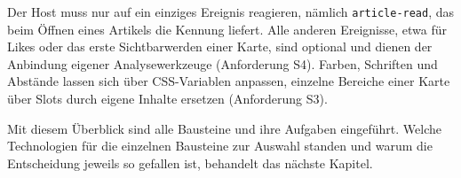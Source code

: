 Der Host muss nur auf ein einziges Ereignis reagieren, nämlich \texttt{article-read}, das beim Öffnen eines Artikels die Kennung liefert.
Alle anderen Ereignisse, etwa für Likes oder das erste Sichtbarwerden einer Karte, sind optional und dienen der Anbindung eigener Analysewerkzeuge (Anforderung S4).
Farben, Schriften und Abstände lassen sich über CSS-Variablen anpassen, einzelne Bereiche einer Karte über Slots durch eigene Inhalte ersetzen (Anforderung S3).

Mit diesem Überblick sind alle Bausteine und ihre Aufgaben eingeführt.
Welche Technologien für die einzelnen Bausteine zur Auswahl standen und warum die Entscheidung jeweils so gefallen ist, behandelt das nächste Kapitel.
